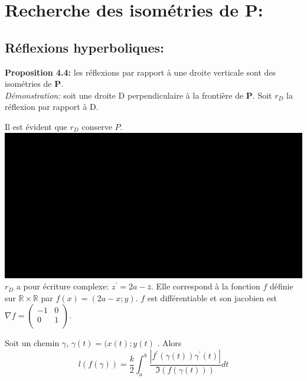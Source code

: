 \documentclass[a4paper, 12pt, twoside]{book}
\begin{document}
 





\section{Recherche des isométries de P:}


\subsection{Réflexions hyperboliques:}

\textbf{Proposition 4.4:} les réflexions par rapport à une droite verticale sont des isométries de \textbf{P}.\\

\textit{Démonstration:} soit une droite D perpendiculaire à la frontière de \textbf{P}. Soit $r_{D}$ la réflexion par rapport à D.\

Il est évident que  $r_{D}$ conserve $P$.\\





\includegraphics[scale=0.8]{figures/hyper1.eps} \\

$r_{D}$ a pour écriture complexe: $z^{'}=2a-\bar{z}$. Elle correspond à la fonction $f$ définie sur $\mathbb{R\times R}$ par $f(x)=(2a-x; y)$. $f$ est différentiable et son jacobien est $\nabla f=\begin{pmatrix}

   -1 & 0  \\

   0 & 1  \\



\end{pmatrix}$.\

Soit un chemin $\gamma$, $\gamma(t)=(x(t); y(t)$ . Alors $$l(f(\gamma))= \dfrac{k}{2}\int_{a}^{b} \dfrac{|f^{'}(\gamma(t))\gamma^{'}(t)|}{\Im(f(\gamma(t)))} dt$$
\end{document}
